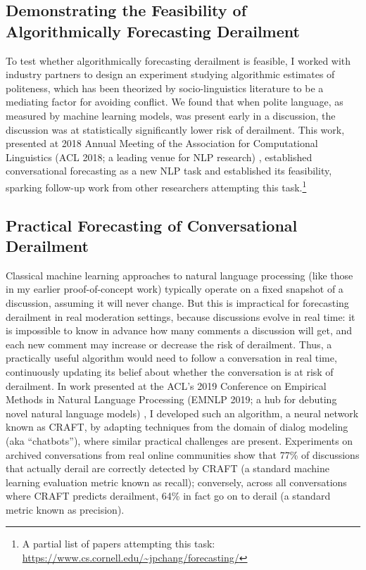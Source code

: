 \documentclass[12pt,letterpaper]{article}
\begin{document}
\subsection{Demonstrating the Feasibility of Algorithmically Forecasting Derailment}
To test whether algorithmically forecasting derailment is feasible, I worked with industry partners
to design an experiment studying algorithmic estimates of politeness, which has been theorized by socio-linguistics literature to be a mediating factor for avoiding conflict. We found that when polite language, as measured by machine learning models, was present early in a discussion, the discussion was at statistically significantly lower risk of derailment.
This work, presented at 2018 Annual Meeting of the Association for Computational Linguistics (ACL 2018; a leading venue for NLP research) \cite{zhang_conversations_2018}, established conversational forecasting as a new NLP task and established its feasibility, sparking follow-up work from other researchers attempting this task.\footnote{A partial list of papers attempting this task: \url{https://www.cs.cornell.edu/~jpchang/forecasting/}}

\subsection{Practical Forecasting of Conversational Derailment}
Classical machine learning approaches to natural language processing 
(like those in my earlier proof-of-concept work) 
typically operate on a fixed snapshot of a discussion, assuming it will never change.
But this is impractical for forecasting derailment in real moderation settings, because discussions evolve in real time: it is impossible to know in advance how many comments a discussion will get, and each new comment may increase or decrease the risk of derailment.
Thus, a practically useful algorithm would need to follow a conversation in real time, continuously updating its belief about whether the conversation is at risk of derailment.
In work presented at the ACL's 2019 Conference on Empirical Methods in Natural Language Processing (EMNLP 2019; a hub for debuting novel natural language models) \cite{chang_trouble_2019}, I developed such an algorithm, a neural network known as CRAFT, by adapting techniques from the domain of dialog modeling (aka ``chatbots''), where similar practical challenges are present.
Experiments on archived conversations from real online communities show that 77\% of discussions that actually derail are correctly detected by CRAFT (a standard machine learning evaluation metric known as recall); conversely, across all conversations where CRAFT predicts derailment, 64\% in fact go on to derail (a standard metric known as precision).
\end{document}
